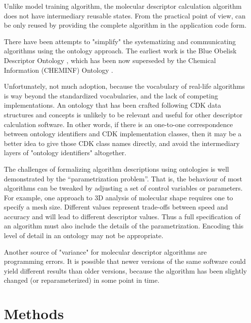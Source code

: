 \documentclass[12pt,letterpaper]{article}
\begin{document}
Unlike model training algorithm, the molecular descriptor calculation
algorithm does not have intermediary reusable states. From the practical
point of view, can be only reused by providing the complete algorithm in 
the application code form.

There have been attempts to "simplify" the systematizing and
communicating algorithms using the ontology approach. The earliest
work is the Blue Obelisk Descriptor Ontology \cite{Guha:2006ac}, which
has been now superseded by the Chemical Information (CHEMINF) Ontology
\cite{Hastings:2011rf}.

Unfortunately, not much adoption, because the vocabulary of
real-life algorithms is way beyond the standardized vocabularies, and
the lack of competing implementations. An ontology that has been
crafted following CDK data structures and concepts is unlikely to be
relevant and useful for other descriptor calculation software. In
other words, if there is an one-to-one correspondence between ontology
identifiers and CDK implementation classes, then it may be a better
idea to give those CDK class names directly, and avoid the
intermediary layers of "ontology identifiers" altogether.

The challenges of formalizing algorithm descriptions using ontologies
is well demonstrated by the ``parametrization problem''.  That is, the
behaviour of most algorithms can be tweaked by adjusting a set of
control variables or parameters. For example, one approach to 3D
analysis of molecular shape requires one to specify a mesh
size. Different values represent trade-offs between speed and accuracy
and will lead to different descriptor values. Thus a full
specification of an algorithm must also include the details of the
parametrization. Encoding this level of detail in an ontology may not
be appropriate.

Another source of "variance" for molecular descriptor
algorithms are programming errors. It is possible that newer versions
of the same software could yield different results than older
versions, because the algorithm has been slightly changed (or
reparameterized) in some point in time.

\section{Methods}
\label{sec:methods}
\end{document}
